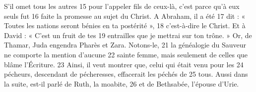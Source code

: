 S'il omet tous les autres	 
15	 	pour l'appeler fils de ceux-là, c'est parce qu'à eux seuls fut	 
16	 	faite la promesse au sujet du Christ. A Abraham, il a été	 
17	 	dit : « Toutes les nations seront bénies en ta postérité »,	 
18	 	c'est-à-dire le Christ. Et à David : « C'est un fruit de tes	 
19	 	entrailles que je mettrai sur ton trône. »
Or, de Thamar, Juda engendra Pharès et Zara. Notons-le,	 
21	 	la généalogie du Sauveur ne comporte la mention d'aucune	 
22	 	sainte femme, mais seulement de celles que blâme l'Écriture.	 
23	 	Ainsi, il veut montrer que, celui qui était venu pour les	 
24	 	pécheurs, descendant de pécheresses, effacerait les péchés de	 
25	 	tous. Aussi dans la suite, est-il parlé de Ruth, la moabite,	 
26	 	et de Bethsabée, l'épouse d'Urie.